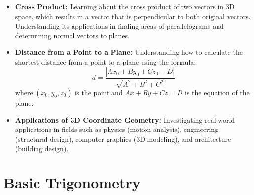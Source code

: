 \documentclass[openany]{book}
\begin{document}
\begin{itemize}
    \item \textbf{Cross Product:} Learning about the cross product of two vectors in 3D space, which results in a vector that is perpendicular to both original vectors. Understanding its applications in finding areas of parallelograms and determining normal vectors to planes.
    \item \textbf{Distance from a Point to a Plane:} Understanding how to calculate the shortest distance from a point to a plane using the formula:
    \[
    d = \frac{|Ax_0 + By_0 + Cz_0 - D|}{\sqrt{A^2 + B^2 + C^2}}
    \]
    where $(x_0, y_0, z_0)$ is the point and $Ax + By + Cz = D$ is the equation of the plane.
    \item \textbf{Applications of 3D Coordinate Geometry:} Investigating real-world applications in fields such as physics (motion analysis), engineering (structural design), computer graphics (3D modeling), and architecture (building design).
\end{itemize}
\section{Basic Trigonometry}
\end{document}
